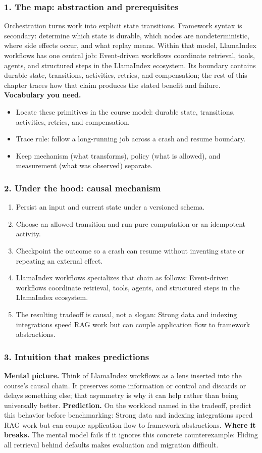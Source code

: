 \subsubsection*{1. The map: abstraction and prerequisites}
Orchestration turns work into explicit state transitions. Framework syntax is secondary: determine which state is durable, which nodes are nondeterministic, where side effects occur, and what replay means.
Within that model, LlamaIndex workflows has one central job: Event-driven workflows coordinate retrieval, tools, agents, and structured steps in the LlamaIndex ecosystem. Its boundary contains durable state, transitions, activities, retries, and compensation; the rest of this chapter traces how that claim produces the stated benefit and failure.
\textbf{Vocabulary you need.}\begin{itemize}
\item Locate these primitives in the course model: durable state, transitions, activities, retries, and compensation.
\item Trace rule: follow a long-running job across a crash and resume boundary.
\item Keep mechanism (what transforms), policy (what is allowed), and measurement (what was observed) separate.
\end{itemize}
\subsubsection*{2. Under the hood: causal mechanism}\begin{enumerate}
\item Persist an input and current state under a versioned schema.
\item Choose an allowed transition and run pure computation or an idempotent activity.
\item Checkpoint the outcome so a crash can resume without inventing state or repeating an external effect.
\item LlamaIndex workflows specializes that chain as follows: Event-driven workflows coordinate retrieval, tools, agents, and structured steps in the LlamaIndex ecosystem.
\item The resulting tradeoff is causal, not a slogan: Strong data and indexing integrations speed RAG work but can couple application flow to framework abstractions.
\end{enumerate}
\subsubsection*{3. Intuition that makes predictions}
\textbf{Mental picture.} Think of LlamaIndex workflows as a lens inserted into the course's causal chain. It preserves some information or control and discards or delays something else; that asymmetry is why it can help rather than being universally better.
\textbf{Prediction.} On the workload named in the tradeoff, predict this behavior before benchmarking: Strong data and indexing integrations speed RAG work but can couple application flow to framework abstractions.
\textbf{Where it breaks.} The mental model fails if it ignores this concrete counterexample: Hiding all retrieval behind defaults makes evaluation and migration difficult.
